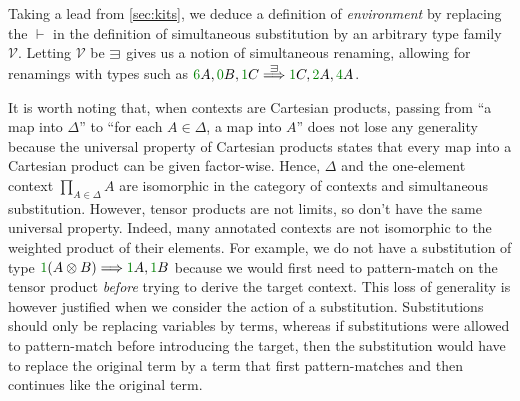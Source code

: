 Taking a lead from \autoref{sec:kits}, we deduce a definition of
\emph{environment} by replacing the $\vdash$ in the definition of simultaneous
substitution by an arbitrary type family $\mathcal V$.
Letting $\mathcal V$ be $\sqni$ gives us a notion of simultaneous renaming,
allowing for renamings with types such as
$\gr6A, \gr0B, \gr1C \stackrel\sqni\Longrightarrow \gr1C, \gr2A, \gr4A$.

It is worth noting that, when contexts are Cartesian products, passing from
``a map into $\Delta$'' to ``for each $A \in \Delta$, a map into $A$'' does not
lose any generality because the universal property of Cartesian products
states that every map into a Cartesian product can be given factor-wise.
Hence, $\Delta$ and the one-element context $\prod_{A \in \Delta}A$ are
isomorphic in the category of contexts and simultaneous substitution.
However, tensor products are not limits, so don't have the same universal
property.
Indeed, many annotated contexts are not isomorphic to the weighted product of
their elements.
For example, we do not have a substitution of type
$\gr1(A \otimes B) \Longrightarrow \gr1A, \gr1B$ because we would first need
to pattern-match on the tensor product \emph{before} trying to derive the
target context.
This loss of generality is however justified when we consider the action of a
substitution.
Substitutions should only be replacing variables by terms, whereas if
substitutions were allowed to pattern-match before introducing the target, then
the substitution would have to replace the original term by a term that first
pattern-matches and then continues like the original term.
